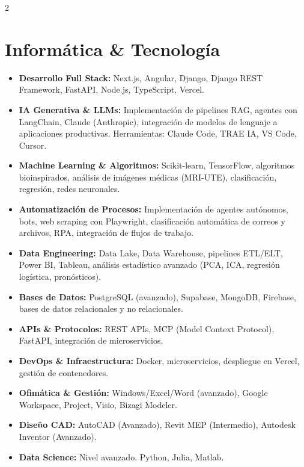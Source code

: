 \documentclass[lighthipster]{simplehipstercv}
\begin{document}
\begin{paracol}{2}
\section*{Informática \& Tecnología}
\begin{itemize}
    \item \textbf{Desarrollo Full Stack:} Next.js, Angular, Django, Django REST Framework, FastAPI, Node.js, TypeScript, Vercel.
    \item \textbf{IA Generativa \& LLMs:} Implementación de pipelines RAG, agentes con LangChain, Claude (Anthropic), integración de modelos de lenguaje a aplicaciones productivas. Herramientas: Claude Code, TRAE IA, VS Code, Cursor.
    \item \textbf{Machine Learning \& Algoritmos:} Scikit-learn, TensorFlow, algoritmos bioinspirados, análisis de imágenes médicas (MRI-UTE), clasificación, regresión, redes neuronales.
    \item \textbf{Automatización de Procesos:} Implementación de agentes autónomos, bots, web scraping con Playwright, clasificación automática de correos y archivos, RPA, integración de flujos de trabajo.
    \item \textbf{Data Engineering:} Data Lake, Data Warehouse, pipelines ETL/ELT, Power BI, Tableau, análisis estadístico avanzado (PCA, ICA, regresión logística, pronósticos).
    \item \textbf{Bases de Datos:} PostgreSQL (avanzado), Supabase, MongoDB, Firebase, bases de datos relacionales y no relacionales.
    \item \textbf{APIs \& Protocolos:} REST APIs, MCP (Model Context Protocol), FastAPI, integración de microservicios.
    \item \textbf{DevOps \& Infraestructura:} Docker, microservicios, despliegue en Vercel, gestión de contenedores.
    \item \textbf{Ofimática \& Gestión:} Windows/Excel/Word (avanzado), Google Workspace, Project, Visio, Bizagi Modeler.
    \item \textbf{Diseño CAD:} AutoCAD (Avanzado), Revit MEP (Intermedio), Autodesk Inventor (Avanzado).
    \item \textbf{Data Science:} Nivel avanzado. Python, Julia, Matlab.
\end{itemize}

\vspace{.5em}



\end{paracol}
\end{document}
